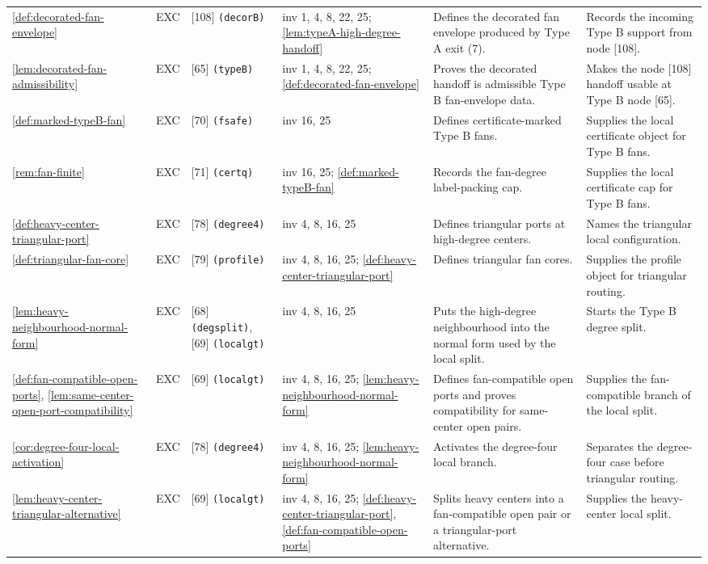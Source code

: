 \documentclass[11pt]{article}
\begin{document}
{\begin{longtable}{L{0.10\textwidth} C{0.045\textwidth} L{0.13\textwidth} L{0.135\textwidth} L{0.28\textwidth} L{0.20\textwidth}}
\cref{def:decorated-fan-envelope} & EXC & [108] \texttt{(decorB)} & inv 1, 4, 8, 22, 25; \cref{lem:typeA-high-degree-handoff} & Defines the decorated fan envelope produced by Type A exit (7). & Records the incoming Type B support from node [108]. \\
\cref{lem:decorated-fan-admissibility} & EXC & [65] \texttt{(typeB)} & inv 1, 4, 8, 22, 25; \cref{def:decorated-fan-envelope} & Proves the decorated handoff is admissible Type B fan-envelope data. & Makes the node [108] handoff usable at Type B node [65]. \\
\cref{def:marked-typeB-fan} & EXC & [70] \texttt{(fsafe)} & inv 16, 25 & Defines certificate-marked Type B fans. & Supplies the local certificate object for Type B fans. \\
\cref{rem:fan-finite} & EXC & [71] \texttt{(certq)} & inv 16, 25; \cref{def:marked-typeB-fan} & Records the fan-degree label-packing cap. & Supplies the local certificate cap for Type B fans. \\
\cref{def:heavy-center-triangular-port} & EXC & [78] \texttt{(degree4)} & inv 4, 8, 16, 25 & Defines triangular ports at high-degree centers. & Names the triangular local configuration. \\
\cref{def:triangular-fan-core} & EXC & [79] \texttt{(profile)} & inv 4, 8, 16, 25; \cref{def:heavy-center-triangular-port} & Defines triangular fan cores. & Supplies the profile object for triangular routing. \\
\cref{lem:heavy-neighbourhood-normal-form} & EXC & [68] \texttt{(degsplit)}, [69] \texttt{(localgt)} & inv 4, 8, 16, 25 & Puts the high-degree neighbourhood into the normal form used by the local split. & Starts the Type B degree split. \\
\cref{def:fan-compatible-open-ports}, \cref{lem:same-center-open-port-compatibility} & EXC & [69] \texttt{(localgt)} & inv 4, 8, 16, 25; \cref{lem:heavy-neighbourhood-normal-form} & Defines fan-compatible open ports and proves compatibility for same-center open pairs. & Supplies the fan-compatible branch of the local split. \\
\cref{cor:degree-four-local-activation} & EXC & [78] \texttt{(degree4)} & inv 4, 8, 16, 25; \cref{lem:heavy-neighbourhood-normal-form} & Activates the degree-four local branch. & Separates the degree-four case before triangular routing. \\
\cref{lem:heavy-center-triangular-alternative} & EXC & [69] \texttt{(localgt)} & inv 4, 8, 16, 25; \cref{def:heavy-center-triangular-port}, \cref{def:fan-compatible-open-ports} & Splits heavy centers into a fan-compatible open pair or a triangular-port alternative. & Supplies the heavy-center local split. \\

\end{longtable}}
\end{document}
